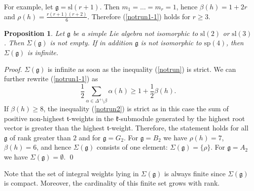 \documentclass{tglat2e}
\newtheorem{prop}[theorem]{Proposition}
\theoremstyle{definition}
\theoremstyle{remark}
\renewcommand{\tt}{\mathfrak{t}}
\newcommand{\kk}{\mathfrak{k}}
\renewcommand{\gg}{\mathfrak{g}}
\begin{document}
For example, let $\gg=\mathrm{sl}(r+1)$. Then $m_1=\dots=m_r=1$, hence $\beta(h)=1+2r$ and $\rho(h)=\frac{r(r+1)(r+2)}{6}$. Therefore (\ref{notrun1-1}) holds for $r\geq 3$.
\begin{prop} Let $\gg$ be a simple Lie algebra not isomorphic to $\mathrm{sl}(2)$ or $\mathrm{sl}(3)$. Then $\Sigma(\gg)$ is not empty. If in addition 
$\gg$ is not isomorphic to $\mathrm{sp}(4)$, then 
$\Sigma(\gg)$ is infinite.
\end{prop}	
\begin{proof} $\Sigma(\gg)$ is infinite as soon as the inequality (\ref{notrun}) is strict. We can further rewrite (\ref{notrun1-1}) as
\begin{equation}\label{notrun2}
\frac{1}{2}\sum_{\alpha\in\Delta^+\setminus \beta}\alpha(h)\geq 1+\frac{1}{2}\beta(h).
\end{equation}
If $\beta(h)\geq 8$, the inequality (\ref{notrun2}) is strict as in this case the sum of positive non-highest $\tt$-weights in the $\kk$-submodule generated by the 
highest root vector is greater than the highest $\tt$-weight. Therefore, the statement holds for all $\gg$ of rank greater than $2$ and for $\gg=G_2$.
For $\gg=B_2$ we have $\rho(h)=7$, $\beta(h)=6$, and hence $\Sigma(\gg)$ consists of one element: $\Sigma(\gg)=\{\rho\}$.  For $\gg=A_2$ we have $\Sigma(\gg)=\emptyset$. 
\qed\end{proof}

Note that the set of integral weights lying in $\Sigma(\gg)$ is always finite since $\Sigma(\gg)$ is compact. Moreover, the cardinality of this finite
set grows with rank.
\end{document}
